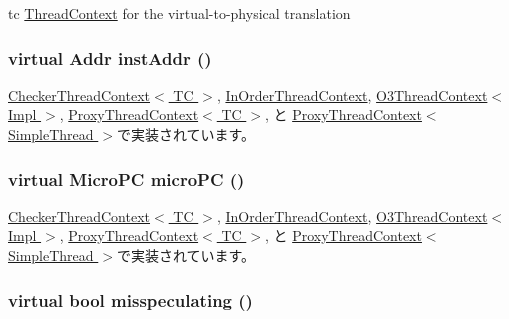 tc \hyperlink{classThreadContext}{ThreadContext} for the virtual-\/to-\/physical translation \hypertarget{classThreadContext_a899644592f5027a7951cfd87b1c548a2}{
\subsubsection[{instAddr}]{\setlength{\rightskip}{0pt plus 5cm}virtual {\bf Addr} instAddr ()}}
\label{classThreadContext_a899644592f5027a7951cfd87b1c548a2}


\hyperlink{classCheckerThreadContext_a53c92716db281ae16ffb693c6d7803c7}{CheckerThreadContext$<$ TC $>$}, \hyperlink{classInOrderThreadContext_a53c92716db281ae16ffb693c6d7803c7}{InOrderThreadContext}, \hyperlink{classO3ThreadContext_a6b3010be20c1be74148cde2913b3f7c3}{O3ThreadContext$<$ Impl $>$}, \hyperlink{classProxyThreadContext_a53c92716db281ae16ffb693c6d7803c7}{ProxyThreadContext$<$ TC $>$}, と \hyperlink{classProxyThreadContext_a53c92716db281ae16ffb693c6d7803c7}{ProxyThreadContext$<$ SimpleThread $>$}で実装されています。\hypertarget{classThreadContext_a263dbcf93ece0a30ea54a77fdb2e3926}{
\subsubsection[{microPC}]{\setlength{\rightskip}{0pt plus 5cm}virtual {\bf MicroPC} microPC ()}}
\label{classThreadContext_a263dbcf93ece0a30ea54a77fdb2e3926}


\hyperlink{classCheckerThreadContext_a1a21696f33a7d38f251687ae0b5e9718}{CheckerThreadContext$<$ TC $>$}, \hyperlink{classInOrderThreadContext_a1a21696f33a7d38f251687ae0b5e9718}{InOrderThreadContext}, \hyperlink{classO3ThreadContext_ae2a795211f2911e8b1f66bab373b6ac2}{O3ThreadContext$<$ Impl $>$}, \hyperlink{classProxyThreadContext_a1a21696f33a7d38f251687ae0b5e9718}{ProxyThreadContext$<$ TC $>$}, と \hyperlink{classProxyThreadContext_a1a21696f33a7d38f251687ae0b5e9718}{ProxyThreadContext$<$ SimpleThread $>$}で実装されています。\hypertarget{classThreadContext_a6b21c2b589ae3065643986e1c3e5f6fa}{
\subsubsection[{misspeculating}]{\setlength{\rightskip}{0pt plus 5cm}virtual bool misspeculating ()}}
\label{classThreadContext_a6b21c2b589ae3065643986e1c3e5f6fa}


